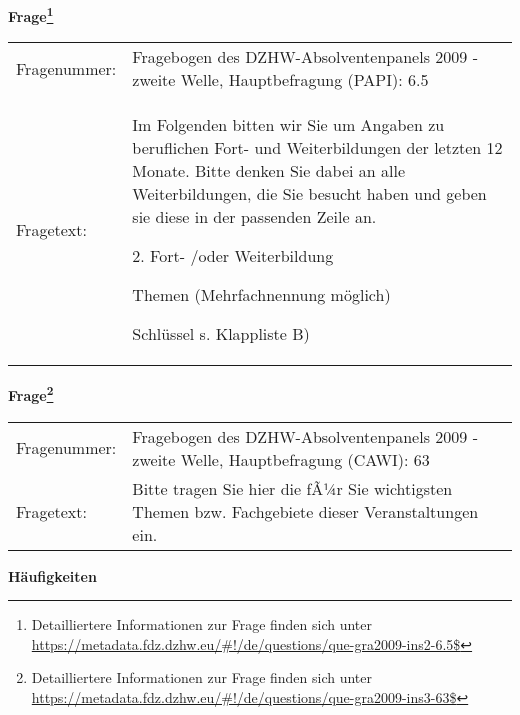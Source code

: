 				\vspace*{0.5cm}
                \noindent\textbf{Frage\footnote{Detailliertere Informationen zur Frage finden sich unter
		              \url{https://metadata.fdz.dzhw.eu/\#!/de/questions/que-gra2009-ins2-6.5$}}}\\
				\begin{tabularx}{\hsize}{@{}lX}
					Fragenummer: &
					  Fragebogen des DZHW-Absolventenpanels 2009 - zweite Welle, Hauptbefragung (PAPI):
					  6.5
 \\
					Fragetext: & Im Folgenden bitten wir Sie um Angaben zu beruflichen Fort- und Weiterbildungen der letzten 12 Monate. Bitte denken Sie dabei an alle Weiterbildungen, die Sie besucht haben und geben sie diese in der passenden Zeile an.\par  2. Fort- /oder Weiterbildung\par  Themen (Mehrfachnennung möglich)\par  Schlüssel s. Klappliste B) \\
				\end{tabularx}
				\vspace*{0.5cm}
                \noindent\textbf{Frage\footnote{Detailliertere Informationen zur Frage finden sich unter
		              \url{https://metadata.fdz.dzhw.eu/\#!/de/questions/que-gra2009-ins3-63$}}}\\
				\begin{tabularx}{\hsize}{@{}lX}
					Fragenummer: &
					  Fragebogen des DZHW-Absolventenpanels 2009 - zweite Welle, Hauptbefragung (CAWI):
					  63
 \\
					Fragetext: & Bitte tragen Sie hier die fÃ¼r Sie wichtigsten Themen bzw. Fachgebiete dieser Veranstaltungen ein. \\
				\end{tabularx}





        		\vspace*{0.5cm}
                \noindent\textbf{Häufigkeiten}

